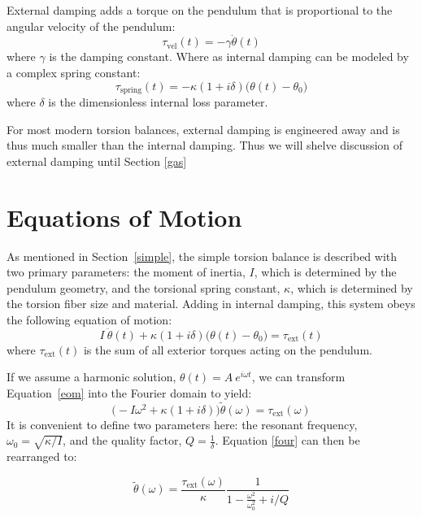 \documentclass{book}
\begin{document}
External damping adds a torque on the pendulum that is proportional to the angular velocity of the pendulum:
\begin{equation}
\tau_{\text{vel}}(t) = -\gamma \dot{\theta}(t)
\end{equation}
where $\gamma$ is the damping constant. Where as internal damping can be modeled by a complex spring constant:
\begin{equation}
\tau_{\text{spring}}(t) =  -\kappa(1+i\delta) \big(\theta(t)-\theta_0\big)
\end{equation}
where $\delta$ is the dimensionless internal loss parameter.

For most modern torsion balances, external damping is engineered away and is thus much smaller than the internal damping. Thus we will shelve discussion of external damping until Section \ref{gas}

\section{Equations of Motion}

\quad As mentioned in Section~\ref{simple}, the simple torsion balance is described with two primary parameters: the moment of inertia, $I$, which is determined by the pendulum geometry, and the torsional spring constant, $\kappa$, which is determined by the torsion fiber size and material. Adding in internal damping, this system obeys the following equation of motion:
\begin{equation}
I~\ddot{\theta}(t)+\kappa(1+i\delta)  \big(\theta(t)-\theta_0\big) = \tau_{\text{ext}}(t) \label{eom}
\end{equation}
where $\tau_{\text{ext}}(t)$ is the sum of all exterior torques acting on the pendulum.

If we assume a harmonic solution, $\theta(t)=A~e^{i\omega t}$, we can transform Equation~\ref{eom} into the Fourier domain to yield:
\begin{equation}
\big(-I\omega^2+\kappa(1+i\delta) \big) \tilde{\theta}(\omega)= \tau_{\text{ext}}(\omega) \label{four}
\end{equation}
It is convenient to define two parameters here: the resonant frequency, $\omega_0=\sqrt{\kappa/I}$, and the quality factor, $Q=\frac{1}{\delta}$. Equation \ref{four} can then be rearranged to:

\begin{equation}
 \tilde{\theta}(\omega)= \frac{\tau_{\text{ext}}(\omega)}{\kappa}\frac{1}{1-\frac{\omega^2}{\omega_0^2} +i/Q} \label{four2}
\end{equation}
\end{document}
